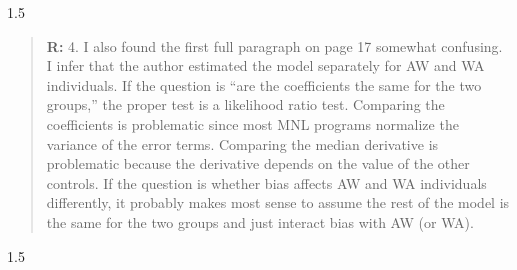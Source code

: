 \documentclass[12pt,english]{article}
\newcommand{\rrxspc}{1.5}
\begin{document}
\begin{refsection}
    \begin{spacing}{\rrxspc}
            \begin{quotation}
                \textbf{R: } 4. I also found the first full paragraph on page 17 somewhat confusing. I infer that the author estimated the model separately for AW and WA individuals. If the question is ``are the coefficients the same for the two groups,'' the proper test is a likelihood ratio test. Comparing the coefficients is problematic since most MNL programs normalize the variance of the error terms. Comparing the median derivative is problematic because the derivative depends on the value of the other controls. If the question is whether bias affects AW and WA individuals differently, it probably makes most sense to assume the rest of the model is the same for the two groups and just interact bias with AW (or WA).
            \end{quotation}
    \end{spacing}
    \begin{spacing}{\rrxspc}

\end{spacing}
\end{refsection}
\end{document}
